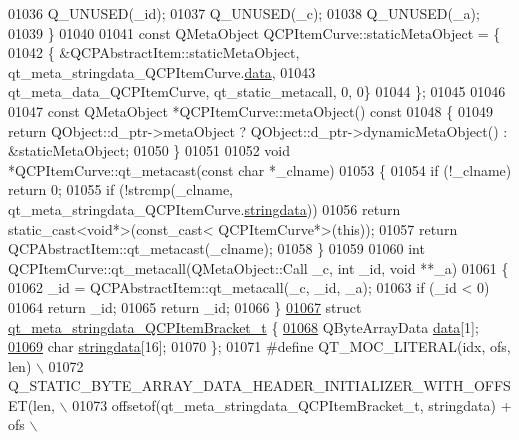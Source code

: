 \begin{DoxyCode}
01036     Q\_UNUSED(\_id);
01037     Q\_UNUSED(\_c);
01038     Q\_UNUSED(\_a);
01039 \}
01040 
01041 \textcolor{keyword}{const} QMetaObject QCPItemCurve::staticMetaObject = \{
01042     \{ &QCPAbstractItem::staticMetaObject, qt\_meta\_stringdata\_QCPItemCurve.\hyperlink{a00016_a0424f9a0b87bc8cefa2966874c4c5667}{data},
01043       qt\_meta\_data\_QCPItemCurve,  qt\_static\_metacall, 0, 0\}
01044 \};
01045 
01046 
01047 \textcolor{keyword}{const} QMetaObject *QCPItemCurve::metaObject()\textcolor{keyword}{ const}
01048 \textcolor{keyword}{}\{
01049     \textcolor{keywordflow}{return} QObject::d\_ptr->metaObject ? QObject::d\_ptr->dynamicMetaObject() : &staticMetaObject;
01050 \}
01051 
01052 \textcolor{keywordtype}{void} *QCPItemCurve::qt\_metacast(\textcolor{keyword}{const} \textcolor{keywordtype}{char} *\_clname)
01053 \{
01054     \textcolor{keywordflow}{if} (!\_clname) \textcolor{keywordflow}{return} 0;
01055     \textcolor{keywordflow}{if} (!strcmp(\_clname, qt\_meta\_stringdata\_QCPItemCurve.\hyperlink{a00016_af1db92bb182f435f88c938cc13a52a2c}{stringdata}))
01056         \textcolor{keywordflow}{return} \textcolor{keyword}{static\_cast<}\textcolor{keywordtype}{void}*\textcolor{keyword}{>}(\textcolor{keyword}{const\_cast<} QCPItemCurve*\textcolor{keyword}{>}(\textcolor{keyword}{this}));
01057     \textcolor{keywordflow}{return} QCPAbstractItem::qt\_metacast(\_clname);
01058 \}
01059 
01060 \textcolor{keywordtype}{int} QCPItemCurve::qt\_metacall(QMetaObject::Call \_c, \textcolor{keywordtype}{int} \_id, \textcolor{keywordtype}{void} **\_a)
01061 \{
01062     \_id = QCPAbstractItem::qt\_metacall(\_c, \_id, \_a);
01063     \textcolor{keywordflow}{if} (\_id < 0)
01064         \textcolor{keywordflow}{return} \_id;
01065     \textcolor{keywordflow}{return} \_id;
01066 \}
\hypertarget{a00016_source_l01067}{}\hyperlink{a00016}{01067} \textcolor{keyword}{struct }\hyperlink{a00016_d3/d32/a00105}{qt\_meta\_stringdata\_QCPItemBracket\_t} \{
\hypertarget{a00016_source_l01068}{}\hyperlink{a00016_a15ff7a0bed3ecf746215a57a076c296b}{01068}     QByteArrayData \hyperlink{a00016_a15ff7a0bed3ecf746215a57a076c296b}{data}[1];
\hypertarget{a00016_source_l01069}{}\hyperlink{a00016_a2e0cf4afc3bc921fbe6f35930bfbd9af}{01069}     \textcolor{keywordtype}{char} \hyperlink{a00016_a2e0cf4afc3bc921fbe6f35930bfbd9af}{stringdata}[16];
01070 \};
01071 \textcolor{preprocessor}{#define QT\_MOC\_LITERAL(idx, ofs, len) \(\backslash\)}
01072 \textcolor{preprocessor}{    Q\_STATIC\_BYTE\_ARRAY\_DATA\_HEADER\_INITIALIZER\_WITH\_OFFSET(len, \(\backslash\)}
01073 \textcolor{preprocessor}{    offsetof(qt\_meta\_stringdata\_QCPItemBracket\_t, stringdata) + ofs \(\backslash\)}

\end{DoxyCode}
